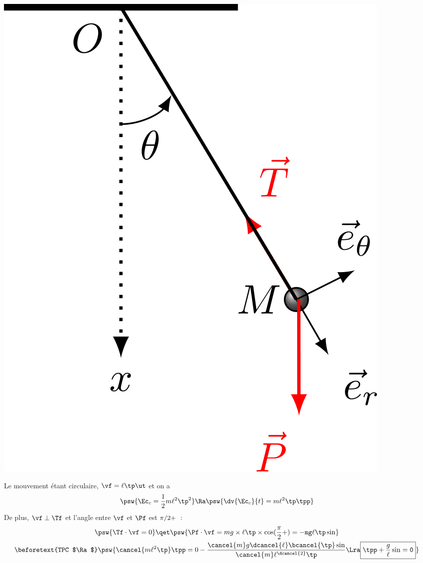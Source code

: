 \documentclass[../../main/main.tex]{subfiles}
\begin{document}
\begin{tcb*}
\begin{minipage}{0.25\linewidth}
\begin{center}
{				\includegraphics[width=.8\linewidth]{pendule_plain}
			}
			\vspace{-15pt}
		\end{center}
	\end{minipage}
	\hfill
	\begin{minipage}{0.70\linewidth}
		Le mouvement étant circulaire, $\vf = \ell\tp\ut$ et on a
		\begin{gather*}
			\psw{\Ec_c = \frac{1}{2}m\ell^2\tp^2}
			\Ra
			\psw{\dv{\Ec_c}{t} = m\ell^2\tp\tpp}
		\end{gather*}
		De plus, $\vf\perp\Tf$ et l'angle entre $\vf$ et $\Pf$ est $\pi/2+\tt$~:
		\begin{gather*}
			\psw{\Tf\cdot\vf = 0}
			\qet
			\psw{
				\Pf\cdot\vf = mg\times\ell\tp\times\cos(\frac{\pi}{2}+\tt) =
				-mg\ell\tp\sin\tt
			}
			\\
			\beforetext{TPC $\Ra$}
			\psw{
				\cancel{m\ell^2\tp}\tpp =
				0 - \frac{
					\cancel{m}g\dcancel{\ell}\bcancel{\tp}\sin\tt
				}{
					\cancel{m}\ell^{\dcancel{2}}\tp
				}
				\Lra
				\boxed{\tpp + \frac{g}{\ell}\sin\tt = 0}
			}
			\vspace{-15pt}
		\end{gather*}
	\end{minipage}
\end{tcb*}
\end{document}
